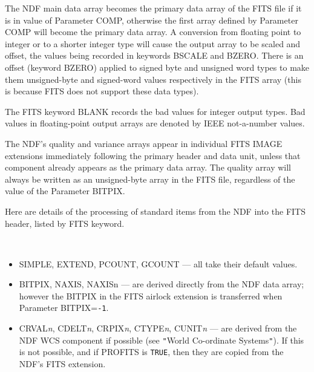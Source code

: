 \documentclass[twoside,11pt]{article}
\newcommand{\htmlref}[2]{#1}
\newcommand{\latex}[1]{#1}
\newcommand{\xref}[3]{#1}
\newcommand{\ssthitemlist}[1]{
  \latex{
  \mbox{} \\
  \vspace{-3.5ex}
  }
  \begin{itemize}
     #1
  \end{itemize}
}
\newcommand{\sstitem}{\item}
\newcommand{\sstitem}{\item}
\begin{document}
{{{         \sstitem
         The NDF main data array becomes the primary data array of the
         FITS file if it is in value of Parameter COMP, otherwise the first
         array defined by Parameter COMP will become the primary data
         array.  A conversion from floating point to integer or to a
         shorter integer type will cause the output array to be scaled and
         offset, the values being recorded in keywords BSCALE and BZERO.
         There is an offset (keyword BZERO) applied to signed byte and
         unsigned word types to make them unsigned-byte and signed-word
         values respectively in the FITS array (this is because FITS does
         not support these data types).

         \sstitem
         The FITS keyword BLANK records the \xref{bad values}{sun95}{se_badmasking}
         for integer output types.  Bad values in floating-point output arrays are
         denoted by IEEE not-a-number values.

         \sstitem
         The NDF's quality and variance arrays appear in individual
         FITS IMAGE extensions immediately following the primary header
         and data unit, unless that component already appears as the
         primary data array.  The quality array will always be written as
         an unsigned-byte array in the FITS file, regardless of the value
         of the Parameter BITPIX.

         \sstitem
         Here are details of the processing of standard items from the
         NDF into the FITS header, listed by FITS keyword.
         \ssthitemlist{

            \sstitem
            SIMPLE, EXTEND, PCOUNT, GCOUNT --- all take their default
              values.

            \sstitem
            BITPIX, NAXIS, NAXISn --- are derived directly from the NDF
              data array; however the BITPIX in the FITS airlock extension
              is transferred when Parameter BITPIX=\texttt{-1}.

            \sstitem
            CRVAL\textit{n}, CDELT\textit{n}, CRPIX\textit{n}, CTYPE\textit{n},
            CUNIT\textit{n} --- are derived
              from the NDF WCS component if possible (see 
              \htmlref{\texttt{"}World Co-ordinate Systems\texttt{"}}
                 {world_coordinate_systems}).
              If this is not possible, and if PROFITS is \texttt{TRUE}, then
              they are copied from the NDF's FITS extension.

}}}}
\end{document}
